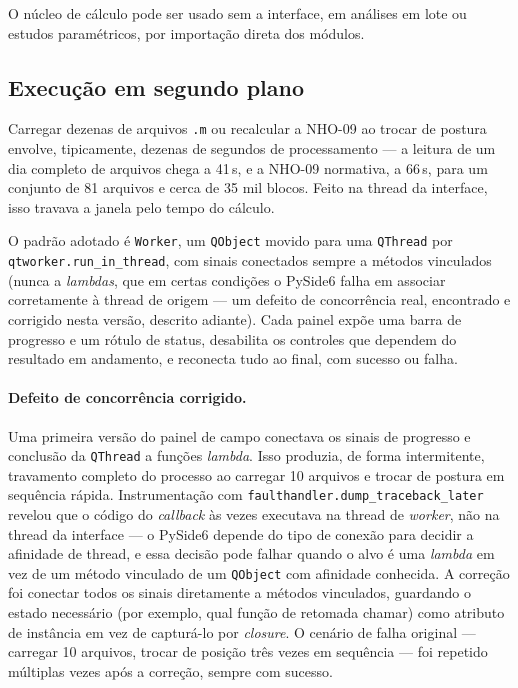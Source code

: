 \documentclass[11pt,a4paper]{article}
\newcommand{\code}[1]{\texttt{\small #1}}
\begin{document}
O núcleo de cálculo pode ser usado sem a interface, em análises em lote ou
estudos paramétricos, por importação direta dos módulos.

\subsection{Execução em segundo plano}
\label{sec:threading}

Carregar dezenas de arquivos \code{.m} ou recalcular a NHO-09 ao trocar de
postura envolve, tipicamente, dezenas de segundos de processamento --- a leitura
de um dia completo de arquivos chega a 41\,s, e a NHO-09 normativa, a 66\,s,
para um conjunto de 81 arquivos e cerca de 35 mil blocos. Feito na thread da
interface, isso travava a janela pelo tempo do cálculo.

O padrão adotado é \code{Worker}, um \code{QObject} movido para uma
\code{QThread} por \code{qtworker.run\_in\_thread}, com sinais conectados
sempre a métodos vinculados (nunca a \emph{lambdas}, que em certas condições o
PySide6 falha em associar corretamente à thread de origem --- um defeito de
concorrência real, encontrado e corrigido nesta versão, descrito adiante). Cada
painel expõe uma barra de progresso e um rótulo de status, desabilita os
controles que dependem do resultado em andamento, e reconecta tudo ao final,
com sucesso ou falha.

\paragraph{Defeito de concorrência corrigido.} Uma primeira versão do painel de
campo conectava os sinais de progresso e conclusão da \code{QThread} a funções
\emph{lambda}. Isso produzia, de forma intermitente, travamento completo do
processo ao carregar 10 arquivos e trocar de postura em sequência rápida.
Instrumentação com \code{faulthandler.dump\_traceback\_later} revelou que o
código do \emph{callback} às vezes executava na thread de \emph{worker}, não na
thread da interface --- o PySide6 depende do tipo de conexão para decidir a
afinidade de thread, e essa decisão pode falhar quando o alvo é uma
\emph{lambda} em vez de um método vinculado de um \code{QObject} com afinidade
conhecida. A correção foi conectar todos os sinais diretamente a métodos
vinculados, guardando o estado necessário (por exemplo, qual função de retomada
chamar) como atributo de instância em vez de capturá-lo por \emph{closure}. O
cenário de falha original --- carregar 10 arquivos, trocar de posição três vezes
em sequência --- foi repetido múltiplas vezes após a correção, sempre com
sucesso.
\end{document}
